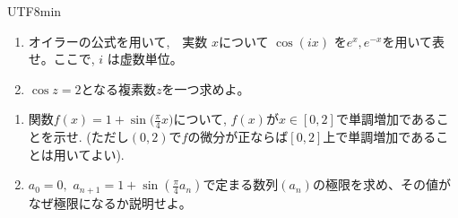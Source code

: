 \documentclass[a4paper,12pt]{article}
\begin{document}
\begin{CJK}{UTF8}{min}
\begin{enumerate}
\item オイラーの公式を用いて,　実数 $x$について $\cos{(i x)}$ を$e^x,e^{-x}$を用いて表せ。ここで, $i$ は虚数単位。
\item $\cos{z}=2$となる複素数$z$を一つ求めよ。
\end{enumerate}
\begin{enumerate}
    \item 関数$f(x) = 1+ \sin\Big(\frac{\pi}4 x\Big)$について, $f(x)$が$x\in [0,2]$で単調増加であることを示せ. (ただし$(0,2)$で$f$の微分が正ならば$[0,2]$上で単調増加であることは用いてよい).  
\item $a_0=0,$ $a_{n+1}=1+\sin{\left(\frac{\pi}{4} a_n \right)}$で定まる数列$(a_n)$の極限を求め、その値がなぜ極限になるか説明せよ。
\end{enumerate}
\ifPDFTeX
\end{CJK}
\fi
\end{document}
